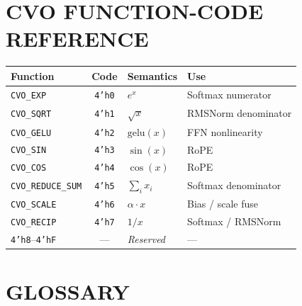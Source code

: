 \documentclass[11pt,a4paper,twoside,openany]{report}
\begin{document}
\chapter{CVO FUNCTION-CODE REFERENCE}

\begin{longtable}{|l|c|l|l|}
\hline
\rowcolor{skytint}
\textbf{Function} & \textbf{Code} & \textbf{Semantics} & \textbf{Use} \\
\hline
\endfirsthead
\texttt{CVO\_EXP}         & \texttt{4'h0} & $e^{x}$             & Softmax numerator \\
\hline
\texttt{CVO\_SQRT}        & \texttt{4'h1} & $\sqrt{x}$          & RMSNorm denominator \\
\hline
\texttt{CVO\_GELU}        & \texttt{4'h2} & $\mathrm{gelu}(x)$  & FFN nonlinearity \\
\hline
\texttt{CVO\_SIN}         & \texttt{4'h3} & $\sin(x)$           & RoPE \\
\hline
\texttt{CVO\_COS}         & \texttt{4'h4} & $\cos(x)$           & RoPE \\
\hline
\texttt{CVO\_REDUCE\_SUM} & \texttt{4'h5} & $\sum_i x_i$        & Softmax denominator \\
\hline
\texttt{CVO\_SCALE}       & \texttt{4'h6} & $\alpha \cdot x$    & Bias / scale fuse \\
\hline
\texttt{CVO\_RECIP}       & \texttt{4'h7} & $1/x$               & Softmax / RMSNorm \\
\hline
\texttt{4'h8}--\texttt{4'hF} & --- & \textit{Reserved} & --- \\
\hline
\end{longtable}

\chapter{GLOSSARY}
\end{document}
